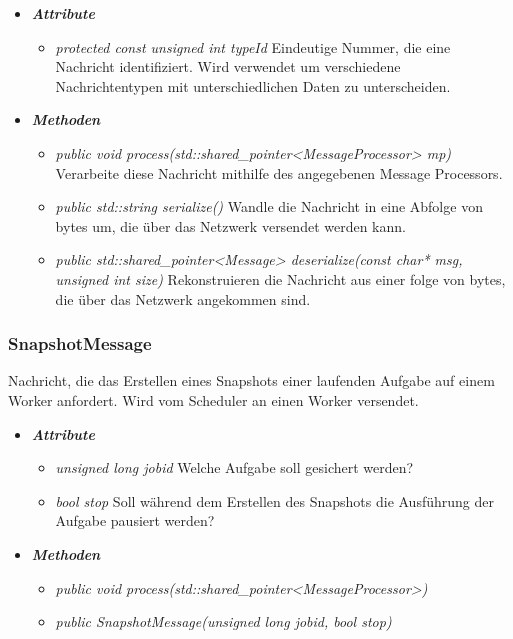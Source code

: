 \documentclass[a4paper,12pt]{article}
\begin{document}
	\begin{itemize}[label={}]

	\item\textit{\textbf{Attribute}}
		\begin{itemize}[label={\textbullet}]
			\item\textit{protected const unsigned int typeId} Eindeutige Nummer, die eine Nachricht identifiziert. Wird verwendet um verschiedene Nachrichtentypen mit unterschiedlichen Daten zu unterscheiden.
			
		\end{itemize}

	\item\textit{\textbf{Methoden}}
		\begin{itemize}[label={\textbullet}]
			\item\textit{public void process(std::shared\_pointer<MessageProcessor> mp)} Verarbeite diese Nachricht mithilfe des angegebenen Message Processors.
			\item\textit{public std::string serialize()} Wandle die Nachricht in eine Abfolge von bytes um, die über das Netzwerk versendet werden kann.
			\item\textit{public std::shared\_pointer<Message> deserialize(const char* msg, unsigned int size)} Rekonstruieren die Nachricht aus einer folge von bytes, die über das Netzwerk angekommen sind.

		\end{itemize}

\end{itemize}


\subsubsection{SnapshotMessage}

Nachricht, die das Erstellen eines Snapshots einer laufenden Aufgabe auf einem Worker anfordert. Wird vom Scheduler an einen Worker versendet.

	\begin{itemize}[label={}]

	\item\textit{\textbf{Attribute}}
		\begin{itemize}[label={\textbullet}]
			\item\textit{unsigned long jobid} Welche Aufgabe soll gesichert werden?
			\item\textit{bool stop} Soll während dem Erstellen des Snapshots die Ausführung der Aufgabe pausiert werden?
			
		\end{itemize}

	\item\textit{\textbf{Methoden}}
		\begin{itemize}[label={\textbullet}]
			\item\textit{public void process(std::shared\_pointer<MessageProcessor>)}
			\item\textit{public SnapshotMessage(unsigned long jobid, bool stop)}

		\end{itemize}

\end{itemize}
\end{document}
